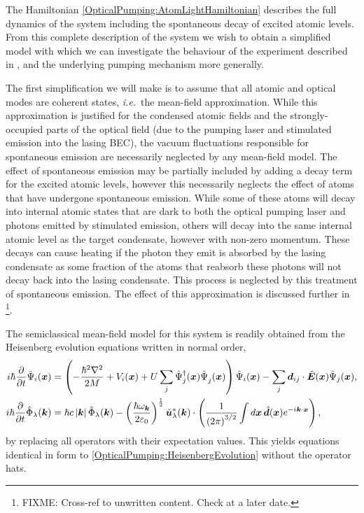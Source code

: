 The Hamiltonian \eqref{OpticalPumping:AtomLightHamiltonian} describes the full dynamics of the system including the spontaneous decay of excited atomic levels.  From this complete description of the system we wish to obtain a simplified model with which we can investigate the behaviour of the experiment described in , and the underlying pumping mechanism more generally.  

The first simplification we will make is to assume that all atomic and optical modes are coherent states, \emph{i.e.}\  the mean-field approximation.  While this approximation is justified for the condensed atomic fields and the strongly-occupied parts of the optical field (due to the pumping laser and stimulated emission into the lasing BEC), the vacuum fluctuations responsible for spontaneous emission are necessarily neglected by any mean-field model.  The effect of spontaneous emission may be partially included by adding a decay term for the excited atomic levels, however this necessarily neglects the effect of atoms that have undergone spontaneous emission.  While some of these atoms will decay into internal atomic states that are dark to both the optical pumping laser and photons emitted by stimulated emission, others will decay into the same internal atomic level as the target condensate, however with non-zero momentum.  These decays can cause heating if the photon they emit is absorbed by the lasing condensate as some fraction of the atoms that reabsorb these photons will not decay back into the lasing condensate. This process is neglected by this treatment of spontaneous emission.  The effect of this approximation is discussed further in \footnote{FIXME: Cross-ref to unwritten content. Check at a later date.}.

The semiclassical mean-field model for this system is readily obtained from the Heisenberg evolution equations written in normal order,
\begin{subequations}
    \label{OpticalPumping:HeisenbergEvolution}
    \begin{align}
        i \hbar \frac{\partial}{\partial t} \hat{\Psi}_i(\vect{x}) &= \left(- \frac{\hbar^2 \nabla^2}{2 M} + V_i(\vect{x}) + U\sum_j\hat{\Psi}_j^\dagger(\vect{x})\hat{\Psi}_j^{\phantom{\dagger}}(\vect{x})\right)\hat{\Psi}_i(\vect{x}) - \sum_{j} \vect{d}_{ij} \cdot \hat{\vect{E}}(\vect{x}) \hat{\Psi}_j(\vect{x}),\\
        i \hbar \frac{\partial}{\partial t} \hat{\Phi}_\lambda(\vect{k}) &= \hbar c \abs{\vect{k}} \hat{\Phi}_\lambda(\vect{k}) - \left(\frac{\hbar \omega_{\vect{k}}}{2 \varepsilon_0}\right)^{\frac{1}{2}} \unitvec{u}_\lambda^*(\vect{k}) \cdot \left( \frac{1}{\left(2\pi\right)^{3/2}} \int d \vect{x}\, \hat{\vect{d}}(\vect{x}) e^{-i \vect{k} \cdot \vect{x}} \right),
    \end{align}
\end{subequations}
by replacing all operators with their expectation values.  This yields equations identical in form to \eqref{OpticalPumping:HeisenbergEvolution} without the operator hats.

